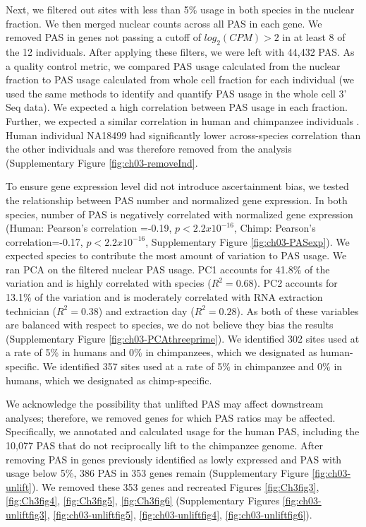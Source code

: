 Next, we filtered out sites with less than 5\% usage in both species in the nuclear fraction. We then merged nuclear counts across all PAS in each gene. We removed PAS in genes not passing a cutoff of $log_{2}(CPM)>2$ in at least 8 of the 12 individuals. After applying these filters, we were left with 44,432 PAS. As a quality control metric, we compared PAS usage calculated from the nuclear fraction to PAS usage calculated from whole cell fraction for each individual (we used the same methods to identify and quantify PAS usage in the whole cell 3' Seq data). We expected a high correlation between PAS usage in each fraction. Further, we expected a similar correlation in human and chimpanzee individuals \citep{mittleman_alternative_2020}. Human individual NA18499 had significantly lower across-species correlation than the other individuals and was therefore removed from the analysis (Supplementary Figure \ref{fig:ch03-removeInd}. 


 To ensure gene expression level did not introduce ascertainment bias, we tested the relationship between PAS number and normalized gene expression. In both species, number of PAS is negatively correlated with normalized gene expression (Human: Pearson's correlation =-0.19, $p< 2.2x10^{-16}$, Chimp: Pearson's correlation=-0.17, $p< 2.2x10^{-16}$, Supplementary Figure \ref{fig:ch03-PASexp}). We expected species to contribute the most amount of variation to PAS usage. We ran PCA on the filtered nuclear PAS usage. PC1 accounts for 41.8\% of the variation and is highly correlated with species ($R^{2} =0.68$). PC2 accounts for 13.1\% of the variation and is moderately correlated with RNA extraction technician ($R^{2}=0.38$) and extraction day ($R^{2}=0.28$). As both of these variables are balanced with respect to species, we do not believe they bias the results (Supplementary Figure \ref{fig:ch03-PCAthreeprime}). We identified 302 sites used at a rate of 5\% in humans and 0\% in chimpanzees, which we designated as human-specific. We identified 357 sites used at a rate of 5\% in chimpanzee and 0\% in humans, which we designated as chimp-specific. 
 
 We acknowledge the possibility that unlifted PAS may affect downstream analyses; therefore, we removed genes for which PAS ratios may be affected. Specifically, we annotated and calculated usage for the human PAS, including the 10,077 PAS that do not reciprocally lift to the chimpanzee genome. After removing PAS in genes previously identified as lowly expressed and PAS with usage below 5\%, 386 PAS in 353 genes remain (Supplementary Figure \ref{fig:ch03-unlift}). We removed these 353 genes and recreated Figures \ref{fig:Ch3fig3},  \ref{fig:Ch3fig4},  \ref{fig:Ch3fig5},  \ref{fig:Ch3fig6} (Supplementary Figures \ref{fig:ch03-unliftfig3},  \ref{fig:ch03-unliftfig5}, \ref{fig:ch03-unliftfig4}, \ref{fig:ch03-unliftfig6}).
 
